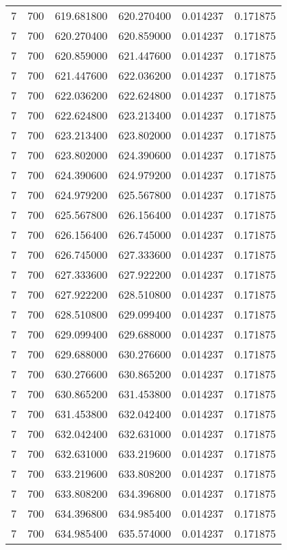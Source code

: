 \begin{longtable}{rrrrrr}
7 & 700 & 619.681800 & 620.270400 & 0.014237 & 0.171875 \\
7 & 700 & 620.270400 & 620.859000 & 0.014237 & 0.171875 \\
7 & 700 & 620.859000 & 621.447600 & 0.014237 & 0.171875 \\
7 & 700 & 621.447600 & 622.036200 & 0.014237 & 0.171875 \\
7 & 700 & 622.036200 & 622.624800 & 0.014237 & 0.171875 \\
7 & 700 & 622.624800 & 623.213400 & 0.014237 & 0.171875 \\
7 & 700 & 623.213400 & 623.802000 & 0.014237 & 0.171875 \\
7 & 700 & 623.802000 & 624.390600 & 0.014237 & 0.171875 \\
7 & 700 & 624.390600 & 624.979200 & 0.014237 & 0.171875 \\
7 & 700 & 624.979200 & 625.567800 & 0.014237 & 0.171875 \\
7 & 700 & 625.567800 & 626.156400 & 0.014237 & 0.171875 \\
7 & 700 & 626.156400 & 626.745000 & 0.014237 & 0.171875 \\
7 & 700 & 626.745000 & 627.333600 & 0.014237 & 0.171875 \\
7 & 700 & 627.333600 & 627.922200 & 0.014237 & 0.171875 \\
7 & 700 & 627.922200 & 628.510800 & 0.014237 & 0.171875 \\
7 & 700 & 628.510800 & 629.099400 & 0.014237 & 0.171875 \\
7 & 700 & 629.099400 & 629.688000 & 0.014237 & 0.171875 \\
7 & 700 & 629.688000 & 630.276600 & 0.014237 & 0.171875 \\
7 & 700 & 630.276600 & 630.865200 & 0.014237 & 0.171875 \\
7 & 700 & 630.865200 & 631.453800 & 0.014237 & 0.171875 \\
7 & 700 & 631.453800 & 632.042400 & 0.014237 & 0.171875 \\
7 & 700 & 632.042400 & 632.631000 & 0.014237 & 0.171875 \\
7 & 700 & 632.631000 & 633.219600 & 0.014237 & 0.171875 \\
7 & 700 & 633.219600 & 633.808200 & 0.014237 & 0.171875 \\
7 & 700 & 633.808200 & 634.396800 & 0.014237 & 0.171875 \\
7 & 700 & 634.396800 & 634.985400 & 0.014237 & 0.171875 \\
7 & 700 & 634.985400 & 635.574000 & 0.014237 & 0.171875 \\

\end{longtable}
